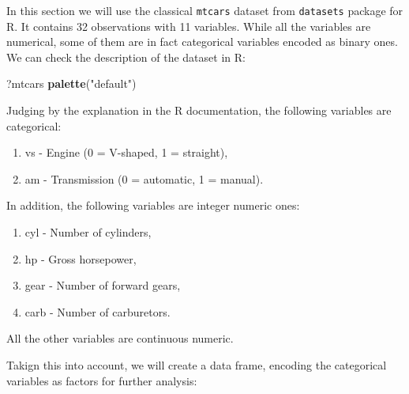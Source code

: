 \documentclass[
]{book}
\newenvironment{Shaded}{\begin{snugshade}}{\end{snugshade}}
\newcommand{\AttributeTok}[1]{\textcolor[rgb]{0.13,0.29,0.53}{#1}}
\newcommand{\DecValTok}[1]{\textcolor[rgb]{0.00,0.00,0.81}{#1}}
\newcommand{\FunctionTok}[1]{\textcolor[rgb]{0.13,0.29,0.53}{\textbf{#1}}}
\newcommand{\NormalTok}[1]{#1}
\newcommand{\OtherTok}[1]{\textcolor[rgb]{0.56,0.35,0.01}{#1}}
\newcommand{\SpecialCharTok}[1]{\textcolor[rgb]{0.81,0.36,0.00}{\textbf{#1}}}
\newcommand{\StringTok}[1]{\textcolor[rgb]{0.31,0.60,0.02}{#1}}
\providecommand{\tightlist}{%
  \setlength{\itemsep}{0pt}\setlength{\parskip}{0pt}}
\theoremstyle{definition}
\theoremstyle{definition}
\theoremstyle{definition}
\theoremstyle{definition}
\theoremstyle{remark}
\begin{document}
In this section we will use the classical \texttt{mtcars} dataset from \texttt{datasets} package for R. It contains 32 observations with 11 variables. While all the variables are numerical, some of them are in fact categorical variables encoded as binary ones. We can check the description of the dataset in R:

\begin{Shaded}
\begin{Highlighting}[]
\NormalTok{?mtcars}
\FunctionTok{palette}\NormalTok{(}\StringTok{"default"}\NormalTok{)}
\end{Highlighting}
\end{Shaded}

Judging by the explanation in the R documentation, the following variables are categorical:

\begin{enumerate}
\def\labelenumi{\arabic{enumi}.}
\tightlist
\item
  vs - Engine (0 = V-shaped, 1 = straight),
\item
  am - Transmission (0 = automatic, 1 = manual).
\end{enumerate}

In addition, the following variables are integer numeric ones:

\begin{enumerate}
\def\labelenumi{\arabic{enumi}.}
\tightlist
\item
  cyl - Number of cylinders,
\item
  hp - Gross horsepower,
\item
  gear - Number of forward gears,
\item
  carb - Number of carburetors.
\end{enumerate}

All the other variables are continuous numeric.

Takign this into account, we will create a data frame, encoding the categorical variables as factors for further analysis:

\begin{Shaded}
\end{Shaded}
\end{document}
